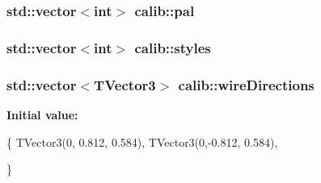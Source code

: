 \hypertarget{namespacecalib_a9b4f225f6c9c22b36481a71520d7f49d}{
\subsubsection[{pal}]{\setlength{\rightskip}{0pt plus 5cm}std\-::vector$<$int$>$ calib\-::pal}}\label{namespacecalib_a9b4f225f6c9c22b36481a71520d7f49d}
\hypertarget{namespacecalib_aa542c134baf42651c4ab1026644ec2ea}{
\subsubsection[{styles}]{\setlength{\rightskip}{0pt plus 5cm}std\-::vector$<$int$>$ calib\-::styles}}\label{namespacecalib_aa542c134baf42651c4ab1026644ec2ea}
\hypertarget{namespacecalib_a05defae1f1c268d06f6e5df5fec34f72}{
\subsubsection[{wire\-Directions}]{\setlength{\rightskip}{0pt plus 5cm}std\-::vector$<$T\-Vector3$>$ calib\-::wire\-Directions}}\label{namespacecalib_a05defae1f1c268d06f6e5df5fec34f72}
{\bfseries Initial value\-:}
\begin{DoxyCode}
\{
    TVector3(0, 0.812, 0.584),
    TVector3(0,-0.812, 0.584),

  \}
\end{DoxyCode}
